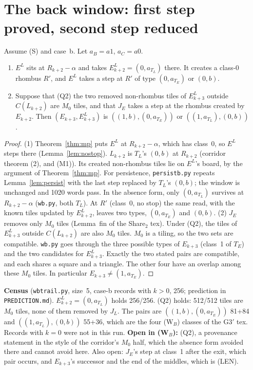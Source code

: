 \documentclass[11pt]{article}
\begin{document}
\section{The back window: first step proved, second step reduced}\label{sec:wb}
\begin{proposition}\label{prop:wb}
Assume (S) and case~b. Let $a_B=a1$, $a_C=a0$.
\begin{enumerate}
\item $E^L$ sits at $R_{k+2}-\alpha$ and takes $E^L_{k+2}=(0,a_{T_L})$ there. It creates a class-0 rhombus $R'$, and $E^L$ takes a step at $R'$ of type $(0,a_{T_E})$ or $(0,b)$.
\item Suppose that (Q2) the two removed non-rhombus tiles of $E^L_{k+3}$ outside $C(L_{k+2})$ are $M_0$ tiles, and that $J_E$ takes a step at the rhombus created by $E_{k+2}$. Then $(E_{k+3},E^L_{k+3})$ is $((1,b),(0,a_{T_E}))$ or $((1,a_{T_L}),(0,b))$.
\end{enumerate}
\end{proposition}
\begin{proof}
(1) Theorem~\ref{thm:mp} puts $E^L$ at $R_{k+2}-\alpha$, which has class~0, so $E^L$ steps there (Lemma~\ref{lem:nostop}). $L_{k+2}$ is $T_L$'s $(0,b)$ at $R_{k+2}$ (corridor theorem (2), and (M1)). Its created non-rhombus tiles lie on $E^L$'s board, by the argument of Theorem~\ref{thm:mp}. For persistence, \texttt{persistb.py} repeats Lemma~\ref{lem:persist} with the last step replaced by $T_L$'s $(0,b)$; the window is unchanged and 1020 words pass. In the absence form, only $(0,a_{T_L})$ survives at $R_{k+2}-\alpha$ (\texttt{wb.py}, both $T_L$). At $R'$ (class~0, no stop) the same read, with the known tiles updated by $E^L_{k+2}$, leaves two types, $(0,a_{T_E})$ and $(0,b)$.
(2) $J_E$ removes only $M_0$ tiles (Lemma~fin of the Share$_2$ tex). Under (Q2), the tiles of $E^L_{k+3}$ outside $C(L_{k+2})$ are also $M_0$ tiles. $M_0$ is a tiling, so the two sets are compatible. \texttt{wb.py} goes through the three possible types of $E_{k+3}$ (class~1 of $T_E$) and the two candidates for $E^L_{k+3}$. Exactly the two stated pairs are compatible, and each shares a square and a triangle. The other four have an overlap among these $M_0$ tiles. In particular $E_{k+3}\neq(1,a_{T_E})$.
\end{proof}
\noindent\textbf{Census} (\texttt{wbtrail.py}, size~5, case-b records with $k>0$, 256; prediction in \texttt{PREDICTION.md}). $E^L_{k+2}=(0,a_{T_L})$ holds 256/256. (Q2) holds: 512/512 tiles are $M_0$ tiles, none of them removed by $J_L$. The pairs are $((1,b),(0,a_{T_E}))$ 81+84 and $((1,a_{T_L}),(0,b))$ 55+36, which are the four (W$_B$) classes of the G3$'$ tex. Records with $k=0$ were not in this run.
\noindent\textbf{Open in (W$_B$):} (Q2), a provenance statement in the style of the corridor's $M_0$ half, which the absence form avoided there and cannot avoid here. Also open: $J_E$'s step at class~1 after the exit, which pair occurs, and $E_{k+3}$'s successor and the end of the middles, which is (LEN).
\end{document}
